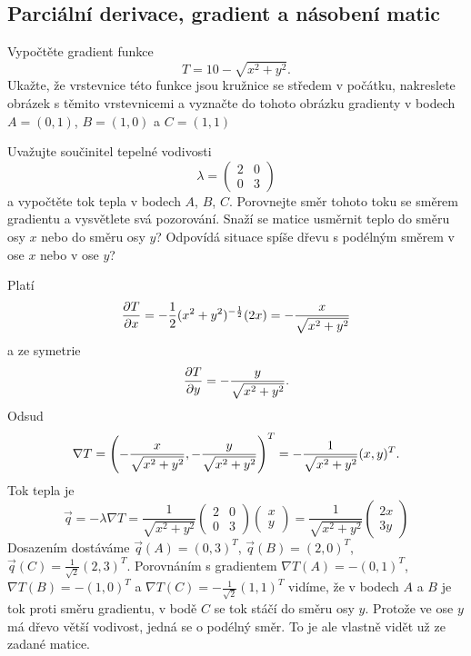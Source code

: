 \konec



\subsection{Parciální derivace, gradient a násobení matic}

Vypočtěte gradient funkce $$T=10-\sqrt{x^2+y^2}.$$ Ukažte, že vrstevnice
této funkce jsou kružnice se středem v počátku, nakreslete obrázek s
těmito vrstevnicemi a vyznačte do tohoto obrázku gradienty v bodech
$A=(0,1)$, $B=(1,0)$ a $C=(1,1)$

Uvažujte součinitel tepelné vodivosti $$\lambda =
\begin{pmatrix}
  2&0\\0&3
\end{pmatrix}$$
a vypočtěte tok tepla v bodech $A$, $B$, $C$. Porovnejte směr tohoto toku se směrem gradientu a vysvětlete svá pozorování. Snaží se matice usměrnit teplo do  směru osy $x$ nebo do  směru osy $y$? Odpovídá situace spíše dřevu s podélným směrem v ose $x$ nebo v ose $y$?


\reseni

Platí $$\pdv{T}{x}=-\frac 12 (x^2+y^2)^{-\frac 12}(2x)=-\frac{x}{\sqrt{x^2+y^2}}$$
a ze symetrie 
$$\pdv{T}{y}=-\frac{y}{\sqrt{x^2+y^2}}.$$
Odsud $$\nabla T=\qty(-\frac{x}{\sqrt{x^2+y^2}},-\frac{y}{\sqrt{x^2+y^2}})^T
=
-\frac 1{\sqrt{x^2+y^2}}(x,y)^T.$$
Tok tepla je
$$\vec q=-\lambda \nabla T=\frac 1{\sqrt{x^2+y^2}}\begin{pmatrix}
  2&0\\0&3
\end{pmatrix}
\begin{pmatrix}
  x\\y
\end{pmatrix}
=\frac 1{\sqrt{x^2+y^2}} \begin{pmatrix}
  2x\\3y
\end{pmatrix}
$$
Dosazením dostáváme $\vec q(A)=(0,3)^T$, $\vec q(B)=(2,0)^T$, $\vec q(C)=\frac 1{\sqrt{2}}(2,3)^T$. Porovnáním s gradientem $\nabla T(A)=-(0,1)^T$, $\nabla T(B)=-(1,0)^T$ a $\nabla T(C)=-\frac 1{\sqrt 2}(1,1)^T$ vidíme, že v bodech $A$  a $B$ je tok proti směru gradientu, v bodě $C$ se tok stáčí do směru osy $y$. Protože ve ose $y$ má dřevo větší vodivost, jedná se o podélný směr. To je ale vlastně vidět už ze zadané matice.

\konec


